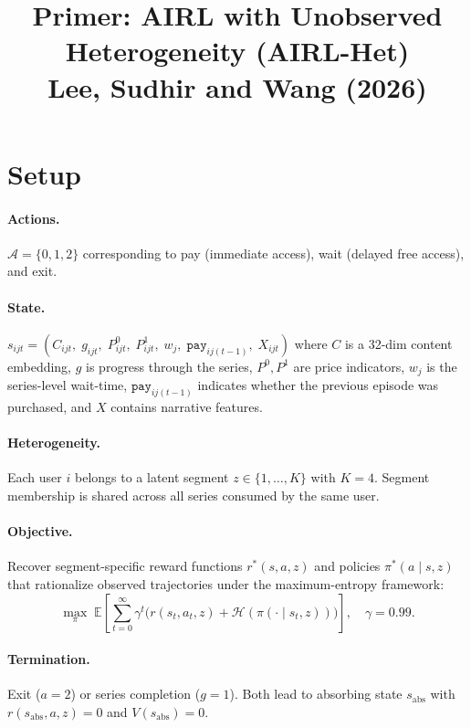 \documentclass[11pt]{article}
\title{Primer: AIRL with Unobserved Heterogeneity (AIRL-Het)\\[4pt]
\large Lee, Sudhir and Wang (2026)}
\author{}
\date{}
\begin{document}
\maketitle
\vspace{-1.5em}

\section*{Setup}

\paragraph{Actions.} $\mathcal{A} = \{0, 1, 2\}$ corresponding to pay (immediate access), wait (delayed free access), and exit.

\paragraph{State.} $s_{ijt} = (C_{ijt},\; g_{ijt},\; P^0_{ijt},\; P^1_{ijt},\; w_j,\; \texttt{pay}_{ij(t-1)},\; X_{ijt})$ where $C$ is a 32-dim content embedding, $g$ is progress through the series, $P^0, P^1$ are price indicators, $w_j$ is the series-level wait-time, $\texttt{pay}_{ij(t-1)}$ indicates whether the previous episode was purchased, and $X$ contains narrative features.

\paragraph{Heterogeneity.} Each user $i$ belongs to a latent segment $z \in \{1, \ldots, K\}$ with $K = 4$. Segment membership is shared across all series consumed by the same user.

\paragraph{Objective.} Recover segment-specific reward functions $r^*(s, a, z)$ and policies $\pi^*(a \mid s, z)$ that rationalize observed trajectories under the maximum-entropy framework:
\[
\max_\pi \; \mathbb{E}\!\left[\sum_{t=0}^{\infty} \gamma^t \big(r(s_t, a_t, z) + \mathcal{H}(\pi(\cdot \mid s_t, z))\big)\right], \quad \gamma = 0.99.
\]

\vspace{-0.5em}
\paragraph{Termination.} Exit ($a = 2$) or series completion ($g = 1$). Both lead to absorbing state $s_{\text{abs}}$ with $r(s_{\text{abs}}, a, z) = 0$ and $V(s_{\text{abs}}) = 0$.
\end{document}
